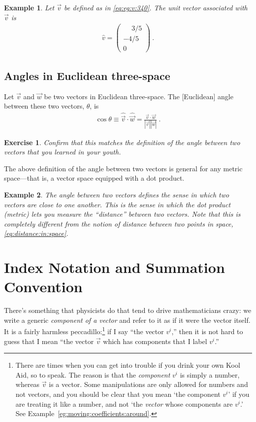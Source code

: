 \documentclass[12pt]{article}
\newtheorem{exercise}{Exercise}[section]
\newtheorem{example}{Example}[section]
\begin{document}
\begin{example}
Let $\vec{v}$ be defined as in \eqref{eq:eg:v:340}. The unit vector associated with $\vec{v}$ is
\begin{align}
    \hat{v} = 
    \begin{pmatrix}
        \phantom{+}3/5 \\
        -4/5\\
        0
    \end{pmatrix} \ .
\end{align}

\end{example}


\subsection{Angles in Euclidean three-space}

Let $\vec{v}$ and $\vec{w}$ be two vectors in Euclidean three-space. The [Euclidean] angle between these two vectors, $\theta$, is 
\begin{align}
    \cos\theta \equiv \hat{\vec{v}}\cdot\hat{\vec{w}} = \frac{\vec{v}\cdot\vec{w}}{|\vec{v}||\vec{w}|} \ .
\end{align}
\begin{exercise}
Confirm that this matches the definition of the angle between two vectors that you learned in your youth.
\end{exercise}
The above definition of the angle between two vectors is general for any metric space---that is, a vector space equipped with a dot product. 

\begin{example}
The angle between two vectors defines the sense in which two vectors are close to one another. This is the sense in which the dot product (metric) lets you measure the ``distance'' between two vectors. Note that this is completely different from the notion of distance between two points in space, \eqref{eq:distance:in:space}. 
\end{example}

\section{Index Notation and Summation Convention}

There's something that physicists do that tend to drive mathematicians crazy: we write a generic \emph{component of a vector} and refer to it as if it were the vector itself. It is a fairly harmless peccadillo:\footnote{There are times when you can get into trouble if you drink your own Kool Aid, so to speak. The reason is that the \emph{component} $v^i$ is simply a number, whereas $\vec{v}$ is a vector. Some manipulations are only allowed for numbers and not vectors, and you should be clear that you mean `the component $v^i$' if you are treating it like a number, and not `the \emph{vector} whose components are $v^i$.' See Example~\ref{eg:moving:coefficients:around}.} if I say ``the vector $v^i$,'' then it is not hard to guess that I mean ``the vector $\vec{v}$ which has components that I label $v^i$.''
\end{document}
